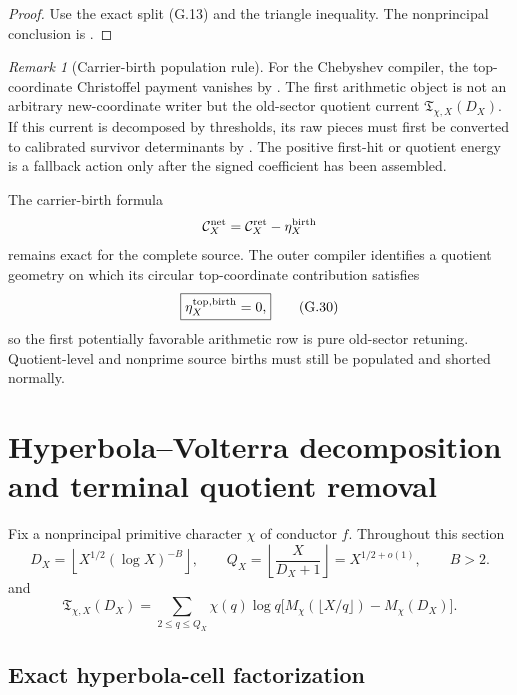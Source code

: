 \documentclass[11pt]{article}
\theoremstyle{definition}
\theoremstyle{remark}
\newtheorem{remark}[theorem]{Remark}
\begin{document}
\begin{proof}
Use the exact split \textup{(G.13)} and the triangle inequality.  The
nonprincipal conclusion is .
\end{proof}

\begin{remark}[Carrier-birth population rule]
For the Chebyshev compiler, the top-coordinate Christoffel payment vanishes by
.  The first arithmetic object is not an arbitrary
new-coordinate writer but the old-sector quotient current
\(\mathfrak T_{\chi,X}(D_X)\).  If this current is decomposed by thresholds,
its raw pieces must first be converted to calibrated survivor determinants by
.  The positive
first-hit or quotient energy is a fallback action only after the signed
coefficient has been assembled.
\end{remark}

The carrier-birth formula
\[
 \mathcal C_X^{\rm net}
 =\mathcal C_X^{\rm ret}-\eta_X^{\rm birth}
\]
remains exact for the complete source.  The outer compiler identifies a quotient geometry on which
its circular top-coordinate contribution satisfies
\[
 \boxed{
 \eta_X^{\rm top,birth}=0,}
 \tag{G.30}
\]
so the first potentially favorable arithmetic row is pure old-sector
retuning.  Quotient-level and nonprime source births must still be populated
and shorted normally.



\section{Hyperbola--Volterra decomposition and terminal quotient removal}
\label{sec:grh-hyperbola}
Fix a nonprincipal primitive character $\chi$ of conductor $f$.  Throughout
this section
\[
 D_X=\left\lfloor X^{1/2}(\log X)^{-B}\right\rfloor,\qquad
 Q_X=\left\lfloor\frac{X}{D_X+1}\right\rfloor=X^{1/2+o(1)},\qquad B>2.
 \tag{H.2}
\]
and
\[
 \mathfrak T_{\chi,X}(D_X)
 =\sum_{2\le q\le Q_X}\chi(q)\log q
   \bigl[M_\chi(\lfloor X/q\rfloor)-M_\chi(D_X)\bigr].
 \tag{H.1}
\]

\subsection{Exact hyperbola-cell factorization}
\label{subsec:hyperbola-hyperbola-factorization}
\end{document}
